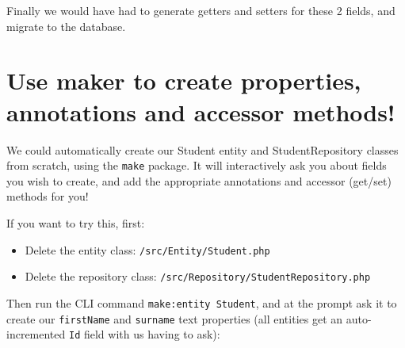 \documentclass[a4paperpaper,openright]{book}
\newenvironment{Shaded}{}{}
\newcommand{\ExtensionTok}[1]{#1}
\newcommand{\NormalTok}[1]{#1}
\newcommand{\StringTok}[1]{\textcolor[rgb]{0.25,0.44,0.63}{#1}}
\begin{document}
Finally we would have had to generate getters and setters for these 2
fields, and migrate to the database.

\hypertarget{use-maker-to-create-properties-annotations-and-accessor-methods}{%
\section{Use maker to create properties, annotations and accessor
methods!}\label{use-maker-to-create-properties-annotations-and-accessor-methods}}

We could automatically create our Student entity and StudentRepository
classes from scratch, using the \texttt{make} package. It will
interactively ask you about fields you wish to create, and add the
appropriate annotations and accessor (get/set) methods for you!

If you want to try this, first:

\begin{itemize}
\item
  Delete the entity class: \texttt{/src/Entity/Student.php}
\item
  Delete the repository class:
  \texttt{/src/Repository/StudentRepository.php}
\end{itemize}

Then run the CLI command \texttt{make:entity\ Student}, and at the
prompt ask it to create our \texttt{firstName} and \texttt{surname} text
properties (all entities get an auto-incremented \texttt{Id} field with
us having to ask):

\begin{Shaded}
\end{Shaded}
\end{document}

